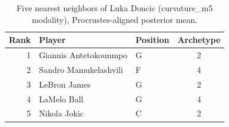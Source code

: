 \begin{table}[htbp]
  \centering\small
  \begin{tabular}{rllc}
    \toprule
    Rank & Player & Position & Archetype \\
    \midrule
    1 & Giannis Antetokounmpo & G & 2 \\
    2 & Sandro Mamukelashvili & F & 4 \\
    3 & LeBron James & G & 2 \\
    4 & LaMelo Ball & G & 4 \\
    5 & Nikola Jokic & C & 2 \\
    \bottomrule
  \end{tabular}
  \caption{Five nearest neighbors of Luka Doncic (curvature_m5 modality), Procrustes-aligned posterior mean.}
  \label{tab:Luka_Doncic_neighbors_curvature_m5}
\end{table}

